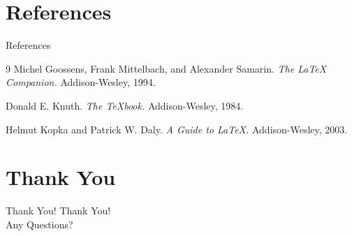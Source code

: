 \documentclass[10pt]{beamer}
\theoremstyle{definition}
\begin{document}
	\section{References}
	\begin{frame}[allowframebreaks]{References}
		\begin{thebibliography}{9}
			Michel Goossens, Frank Mittelbach, and Alexander Samarin.
			\textit{The \LaTeX{} Companion.}
			Addison-Wesley, 1994.
			
			Donald E. Knuth.
			\textit{The TeXbook.}
			Addison-Wesley, 1984.
			
			Helmut Kopka and Patrick W. Daly.
			\textit{A Guide to LaTeX.}
			Addison-Wesley, 2003.
		\end{thebibliography}
	\end{frame}
	
	\section{Thank You}
	\begin{frame}{Thank You!}
		\centering
		\LARGE Thank You!\\[1em]
		Any Questions?
	\end{frame}
	
\end{document}
